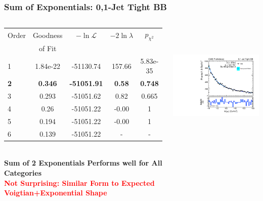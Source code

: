 \documentclass{beamer}
\newcommand{\tredbf}[1]{\textcolor{red}{\bf #1}}
\begin{document}
\begin{frame}
\frametitle{Sum of Exponentials: 0,1-Jet Tight BB}
  \begin{columns}[c]
   \column{60mm}
      \begin{center}
      \tiny
\begin{tabular}{|l|c|c|c|c|} \hline
Order & Goodness & $-\ln\mathcal{L}$ & $-2\ln\lambda$ & $p_{\chi^2}$ \\ 
 & of Fit  &  & &  \\ \hline \hline
1 & 1.84e-22 & -51130.74 & 157.66 & 5.83e-35  \\ \hline
\bf 2 & \bf 0.346 & \bf -51051.91 & \bf 0.58 & \bf 0.748  \\ \hline
3 & 0.293 & -51051.62 & 0.82 & 0.665  \\ \hline
4 & 0.26 & -51051.22 & -0.00 & 1  \\ \hline
5 & 0.194 & -51051.22 & -0.00 & 1  \\ \hline
6 & 0.139 & -51051.22 & - & -  \\ \hline
\end{tabular}
\\
\normalsize
\vspace{2em}
\textbf{
Sum of 2 Exponentials Performs well for All Categories}
\\
\vspace{1em}
\tredbf{Not Surprising: Similar Form to Expected Voigtian+Exponential Shape}
      \end{center}
   \column{60mm}
      \begin{center}
        \includegraphics[height=60mm]{wholeRangeHggStudy1/plotsOrderStudyExpPow/order_Shape_Jets01PassPtG10BB_SumExp2}
      \end{center}
  \end{columns}
  \begin{center}
  \end{center}
\end{frame}
\end{document}
